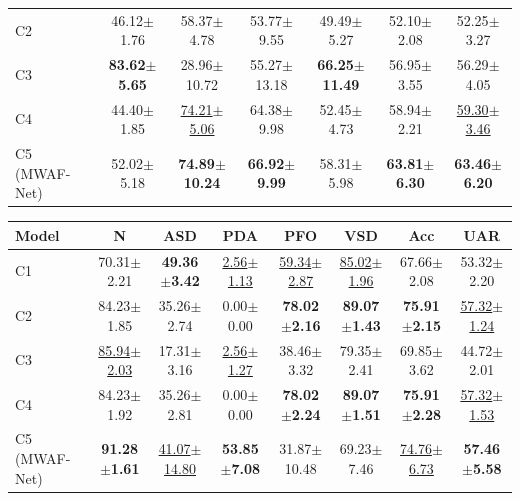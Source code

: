 \begin{table}[H]
\begin{tabular*}{\linewidth}{@{\extracolsep{\fill}}lcccccc@{}}
C2 & 46.12$\pm$1.76 & 58.37$\pm$4.78 & 53.77$\pm$9.55 & 49.49$\pm$5.27 & 52.10$\pm$2.08 & 52.25$\pm$3.27\\
C3 & \textbf{83.62$\pm$5.65} & 28.96$\pm$10.72 & 55.27$\pm$13.18 & \textbf{66.25$\pm$11.49} & 56.95$\pm$3.55 & 56.29$\pm$4.05\\
C4 & 44.40$\pm$1.85 & \underline{74.21$\pm$5.06} & 64.38$\pm$9.98 & 52.45$\pm$4.73 & 58.94$\pm$2.21 & \underline{59.30$\pm$3.46}\\
C5 (MWAF-Net) & 52.02$\pm$5.18 & \textbf{74.89$\pm$10.24} & \textbf{66.92$\pm$9.99} & 58.31$\pm$5.98 & \textbf{63.81$\pm$6.30} & \textbf{63.46$\pm$6.20}\\
\bottomrule\end{tabular*}
\endgroup
{}
\begingroup
\fontsize{8.5}{10}\selectfont
\setlength{\tabcolsep}{4pt}\renewcommand{\arraystretch}{1.04}
\begin{tabular*}{\linewidth}{@{\extracolsep{\fill}}lccccccc@{}}\toprule
\textbf{Model} & \textbf{N} & \textbf{ASD} & \textbf{PDA} & \textbf{PFO} & \textbf{VSD} & \textbf{Acc} & \textbf{UAR}\\\midrule
C1 & 70.31$\pm$2.21 & \textbf{49.36$\pm$3.42} & \underline{2.56$\pm$1.13} & \underline{59.34$\pm$2.87} & \underline{85.02$\pm$1.96} & 67.66$\pm$2.08 & 53.32$\pm$2.20\\
C2 & 84.23$\pm$1.85 & 35.26$\pm$2.74 & 0.00$\pm$0.00 & \textbf{78.02$\pm$2.16} & \textbf{89.07$\pm$1.43} & \textbf{75.91$\pm$2.15} & \underline{57.32$\pm$1.24}\\
C3 & \underline{85.94$\pm$2.03} & 17.31$\pm$3.16 & \underline{2.56$\pm$1.27} & 38.46$\pm$3.32 & 79.35$\pm$2.41 & 69.85$\pm$3.62 & 44.72$\pm$2.01\\
C4 & 84.23$\pm$1.92 & 35.26$\pm$2.81 & 0.00$\pm$0.00 & \textbf{78.02$\pm$2.24} & \textbf{89.07$\pm$1.51} & \textbf{75.91$\pm$2.28} & \underline{57.32$\pm$1.53}\\
C5 (MWAF-Net) & \textbf{91.28$\pm$1.61} & \underline{41.07$\pm$14.80} & \textbf{53.85$\pm$7.08} & 31.87$\pm$10.48 & 69.23$\pm$7.46 & \underline{74.76$\pm$6.73} & \textbf{57.46$\pm$5.58}\\
\bottomrule\end{tabular*}
\endgroup
\end{table}



